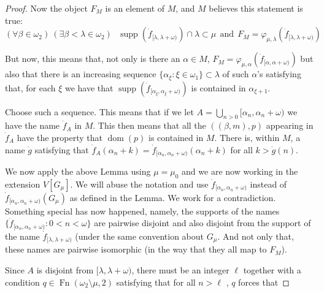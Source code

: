 \documentclass{amsart}
\theoremstyle{plain}
\theoremstyle{definition}
\theoremstyle{remark}
\theoremstyle{plain}
\theoremstyle{definition}
\theoremstyle{remark}
\begin{document}
\begin{proof}
        Now the object $F_M$ is an
        element of $M$, and $M$ believes this statement is true:
        $$
        (\forall \beta\in\omega_2)~ (\exists \beta<\lambda\in \omega_2)~~~
        \operatorname{supp}(\dot f_{[\lambda,\lambda+\omega)})
        \cap \lambda\subset \mu \ \ \mbox{and}\ \
        F_M = \varphi_{\mu,\lambda}(\dot f_{[\lambda,\lambda+\omega)})$$


        But now, this  means that,
        not only is there  an $\alpha\in M$,
        $ F_M = \varphi_{\mu,\alpha}(\dot f_{[\alpha,\alpha+\omega)})$
        but also that there is an increasing sequence
         $\{\alpha_\xi : \xi  \in \omega_1\}\subset \lambda$ of
         such $\alpha$'s satisfying that, for each $\xi$
        we have that $\operatorname{supp}(\dot
        f_{[\alpha_\xi,\alpha_\xi+\omega)})$ is contained in $\alpha_{\xi+1}$.

        Choose such a sequence.
         This means that if we let $A = \bigcup_{n>0} [\alpha_n,\alpha_n+\omega)$ we
         have the name $\dot f_A$ in $M$. This then means that all
         the $( (\beta,m) , p)$ appearing in $\dot f_A$ have the property
         that $\mathop{dom}(p)$ is contained in $M$.
        There is, within $M$, a name $\dot g$ satisfying that
         $\dot f_A(\alpha_n+k) = \dot f_{[\alpha_n,\alpha_n+\omega)}(\alpha_n+k)$
        for all $k >\dot g(n)$.

        \bigskip

        We now apply the above Lemma using $\mu = \mu_0$ and we are now
        working in the extension $V[G_\mu]$. We will abuse the notation
        and use $\dot f_{[\alpha_n,\alpha_n+\omega)}$ instead of
          $\dot f_{[\alpha_n,\alpha_n+\omega)}(G_{\mu})$ as defined in
          the Lemma.
        We work for a contradiction. Something special has now happened,
         namely,  the supports of the names $\{
        \dot f_{[\alpha_n, \alpha_n+\omega)} :  0< n<\omega\}$ are pairwise disjoint
        and also disjoint from the support of the name
         $\dot f_{[\lambda,\lambda+\omega)}$ (under the same convention about
         $G_\mu$.  And not only that, these names are pairwise isomorphic (in
         the way that they all map to $F_M$).


        \bigskip

        Since $A$ is disjoint from $[\lambda,\lambda+\omega)$,
        there must be an integer $\ell$
        together with a condition
         $q\in \mathop{Fn}(\omega_2\setminus \mu,2)$ satisfying that for all
         $n>\ell$ , $q$ forces that


\end{proof}
\end{document}
